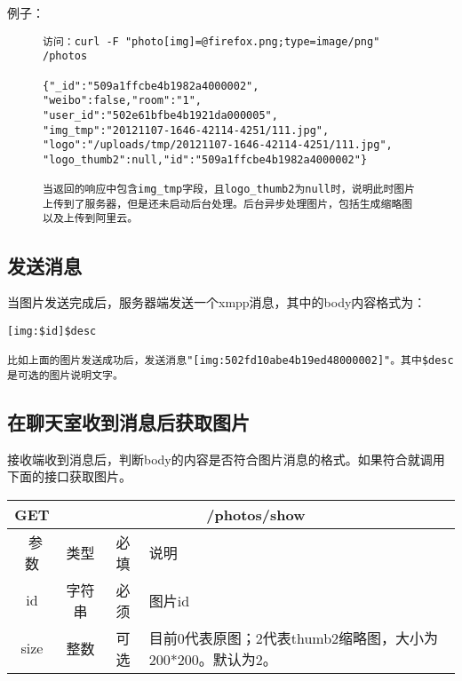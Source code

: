 例子：

\begin{figure}[H]
\begin{verbatim}
访问：curl -F "photo[img]=@firefox.png;type=image/png" 
/photos

{"_id":"509a1ffcbe4b1982a4000002",
"weibo":false,"room":"1",
"user_id":"502e61bfbe4b1921da000005",
"img_tmp":"20121107-1646-42114-4251/111.jpg",
"logo":"/uploads/tmp/20121107-1646-42114-4251/111.jpg",
"logo_thumb2":null,"id":"509a1ffcbe4b1982a4000002"}

当返回的响应中包含img_tmp字段，且logo_thumb2为null时，说明此时图片上传到了服务器，但是还未启动后台处理。后台异步处理图片，包括生成缩略图以及上传到阿里云。

\end{verbatim}
\end{figure}


\subsection{发送消息}
当图片发送完成后，服务器端发送一个xmpp消息，其中的body内容格式为：

\begin{verbatim}
[img:$id]$desc

比如上面的图片发送成功后，发送消息"[img:502fd10abe4b19ed48000002]"。其中$desc是可选的图片说明文字。
\end{verbatim}

\subsection{在聊天室收到消息后获取图片}

接收端收到消息后，判断body的内容是否符合图片消息的格式。如果符合就调用下面的接口获取图片。

\begin{table}[H]
   \begin{center}
\begin{tabular}{|c|c|c|p{12cm}|}
\hline
GET & \multicolumn{3}{|c|}{/photos/show} \\
\hline\hline
 \  参数  & 类型 & 必填 &  说明  \\
  \hline
 id  & 字符串 & 必须 & 图片id\\
\hline
 size  & 整数 & 可选 &  目前0代表原图；2代表thumb2缩略图，大小为200*200。默认为2。\\ 
\hline
\end{tabular}
   \end{center}
\end{table}

